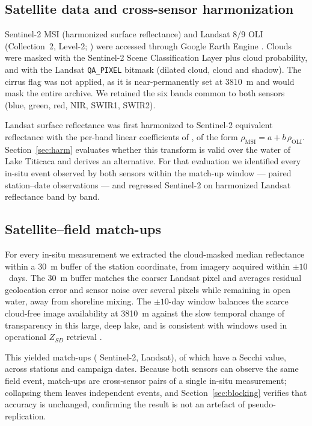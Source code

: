 \documentclass[final,5p,times,twocolumn,authoryear]{elsarticle}
\begin{document}
\subsection{Satellite data and cross-sensor harmonization}

Sentinel-2 MSI (harmonized surface reflectance) and Landsat 8/9 OLI
(Collection~2, Level-2; \citealp{Vermote2016}) were accessed through Google
Earth Engine \citep{Gorelick2017}. Clouds were masked with the Sentinel-2
Scene Classification Layer plus cloud probability, and with the Landsat
\texttt{QA\_PIXEL} bitmask (dilated cloud, cloud and shadow). The cirrus flag
was not applied, as it is near-permanently set at 3810~m and would mask the
entire archive. We retained the six bands common to both sensors (blue,
green, red, NIR, SWIR1, SWIR2).

Landsat surface reflectance was first harmonized to Sentinel-2 equivalent
reflectance with the per-band linear coefficients of \citet{Roy2016}, of the
form $\rho_{\mathrm{MSI}} = a + b\,\rho_{\mathrm{OLI}}$.
Section~\ref{sec:harm} evaluates whether this transform is valid over the
water of Lake Titicaca and derives an alternative. For that evaluation we
identified every in-situ event observed by both sensors within the match-up
window --- \numPairedEvents{} paired station--date observations --- and
regressed Sentinel-2 on harmonized Landsat reflectance band by band.

\subsection{Satellite--field match-ups}

For every in-situ measurement we extracted the cloud-masked median
reflectance within a 30~m buffer of the station coordinate, from imagery
acquired within $\pm10$~days. The 30~m buffer matches the coarser Landsat
pixel and averages residual geolocation error and sensor noise over several
pixels while remaining in open water, away from shoreline mixing. The
$\pm10$-day window balances the scarce cloud-free image availability at
3810~m against the slow temporal change of transparency in this large, deep
lake, and is consistent with windows used in operational $Z_{SD}$ retrieval
\citep{Kloiber2002,Zhang2022}.

This yielded \numMatchupsTotal{} match-ups (\numMatchupsSTwo{} Sentinel-2,
\numMatchupsLs{} Landsat), of which \numMatchupsSecchi{} have a Secchi value,
across \numStations{} stations and \numCampaigns{} campaign dates. Because
both sensors can observe the same field event, \numCrossSensorPairs{}
match-ups are cross-sensor pairs of a single in-situ measurement; collapsing
them leaves \numIndependentEvents{} independent events, and
Section~\ref{sec:blocking} verifies that accuracy is unchanged, confirming
the result is not an artefact of pseudo-replication.
\end{document}
